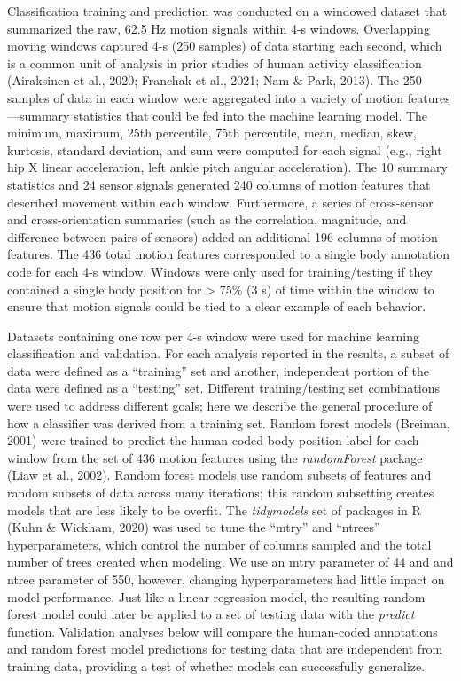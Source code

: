 \documentclass[
  man]{apa6}
\begin{document}
Classification training and prediction was conducted on a windowed dataset that summarized the raw, 62.5 Hz motion signals within 4-s windows. Overlapping moving windows captured 4-s (250 samples) of data starting each second, which is a common unit of analysis in prior studies of human activity classification (Airaksinen et al., 2020; Franchak et al., 2021; Nam \& Park, 2013). The 250 samples of data in each window were aggregated into a variety of motion features---summary statistics that could be fed into the machine learning model. The minimum, maximum, 25th percentile, 75th percentile, mean, median, skew, kurtosis, standard deviation, and sum were computed for each signal (e.g., right hip X linear acceleration, left ankle pitch angular acceleration). The 10 summary statistics and 24 sensor signals generated 240 columns of motion features that described movement within each window. Furthermore, a series of cross-sensor and cross-orientation summaries (such as the correlation, magnitude, and difference between pairs of sensors) added an additional 196 columns of motion features. The 436 total motion features corresponded to a single body annotation code for each 4-s window. Windows were only used for training/testing if they contained a single body position for \textgreater{} 75\% (3 s) of time within the window to ensure that motion signals could be tied to a clear example of each behavior.

Datasets containing one row per 4-s window were used for machine learning classification and validation. For each analysis reported in the results, a subset of data were defined as a ``training'' set and another, independent portion of the data were defined as a ``testing'' set. Different training/testing set combinations were used to address different goals; here we describe the general procedure of how a classifier was derived from a training set. Random forest models (Breiman, 2001) were trained to predict the human coded body position label for each window from the set of 436 motion features using the \emph{randomForest} package (Liaw et al., 2002). Random forest models use random subsets of features and random subsets of data across many iterations; this random subsetting creates models that are less likely to be overfit. The \emph{tidymodels} set of packages in R (Kuhn \& Wickham, 2020) was used to tune the ``mtry'' and ``ntrees'' hyperparameters, which control the number of columns sampled and the total number of trees created when modeling. We use an mtry parameter of 44 and and ntree parameter of 550, however, changing hyperparameters had little impact on model performance. Just like a linear regression model, the resulting random forest model could later be applied to a set of testing data with the \emph{predict} function. Validation analyses below will compare the human-coded annotations and random forest model predictions for testing data that are independent from training data, providing a test of whether models can successfully generalize.
\end{document}
